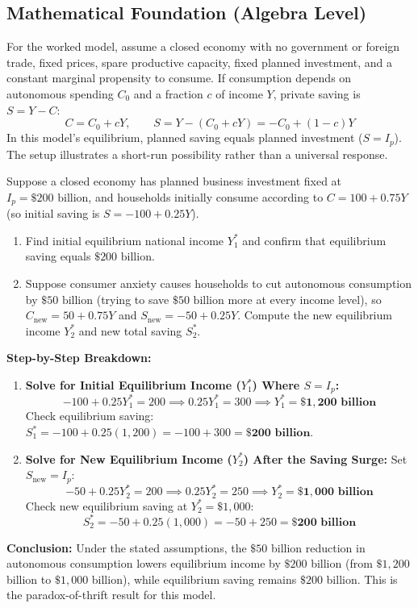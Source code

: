 \documentclass[11pt,letterpaper]{article}
\begin{document}
\subsection*{Mathematical Foundation (Algebra Level)}
For the worked model, assume a closed economy with no government or foreign trade, fixed prices, spare productive capacity, fixed planned investment, and a constant marginal propensity to consume. If consumption depends on autonomous spending $C_0$ and a fraction $c$ of income $Y$, private saving is $S=Y-C$:
\begin{equation}
C = C_0 + cY, \qquad S = Y - (C_0 + cY) = -C_0 + (1 - c)Y
\end{equation}
In this model's equilibrium, planned saving equals planned investment ($S=I_p$). The setup illustrates a short-run possibility rather than a universal response.

\begin{tcolorbox}[colback=LightSlate,colframe=CourseTeal,title=\textbf{Work It Out: Equilibrium Income and the Paradox of Thrift}]
Suppose a closed economy has planned business investment fixed at $I_p = \$200\text{ billion}$, and households initially consume according to $C = 100 + 0.75Y$ (so initial saving is $S = -100 + 0.25Y$).
\begin{enumerate}
    \item Find initial equilibrium national income $Y_1^*$ and confirm that equilibrium saving equals $\$200\text{ billion}$.
    \item Suppose consumer anxiety causes households to cut autonomous consumption by $\$50\text{ billion}$ (trying to save $\$50\text{ billion}$ more at every income level), so $C_{\text{new}} = 50 + 0.75Y$ and $S_{\text{new}} = -50 + 0.25Y$. Compute the new equilibrium income $Y_2^*$ and new total saving $S_2^*$.
\end{enumerate}

\noindent\textbf{Step-by-Step Breakdown:}
\begin{enumerate}
    \item \textbf{Solve for Initial Equilibrium Income ($Y_1^*$) Where $S = I_p$:}
    \[
    -100 + 0.25Y_1^* = 200 \implies 0.25Y_1^* = 300 \implies Y_1^* = \mathbf{\$1{,}200\text{ billion}}
    \]
    Check equilibrium saving: $S_1^* = -100 + 0.25(1{,}200) = -100 + 300 = \mathbf{\$200\text{ billion}}$.

    \item \textbf{Solve for New Equilibrium Income ($Y_2^*$) After the Saving Surge:}
    Set $S_{\text{new}} = I_p$:
    \[
    -50 + 0.25Y_2^* = 200 \implies 0.25Y_2^* = 250 \implies Y_2^* = \mathbf{\$1{,}000\text{ billion}}
    \]
    Check new equilibrium saving at $Y_2^* = \$1{,}000$:
    \[
    S_2^* = -50 + 0.25(1{,}000) = -50 + 250 = \mathbf{\$200\text{ billion}}
    \]
\end{enumerate}
\textbf{Conclusion:} Under the stated assumptions, the $\$50$ billion reduction in autonomous consumption lowers equilibrium income by $\$200$ billion (from $\$1{,}200$ billion to $\$1{,}000$ billion), while equilibrium saving remains $\$200$ billion. This is the paradox-of-thrift result for this model.
\end{tcolorbox}
\end{document}

